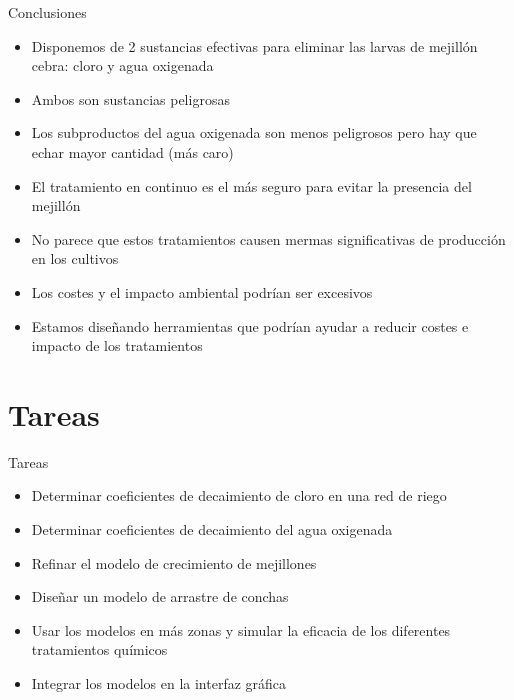 \documentclass[pdr]{beamer}
\begin{document}
\begin{frame}{Conclusiones}
	\begin{itemize}
		\item Disponemos de 2 sustancias efectivas para eliminar las
			larvas de mejillón cebra: cloro y agua oxigenada
		\item Ambos son sustancias peligrosas
		\item Los subproductos del agua oxigenada son menos peligrosos
			pero hay que echar mayor cantidad (más caro)
		\item El tratamiento en continuo es el más seguro para evitar la
			presencia del mejillón
		\item No parece que estos tratamientos causen mermas
			significativas de producción en los cultivos
		\item Los costes y el impacto ambiental podrían ser excesivos
		\item Estamos diseñando herramientas que podrían ayudar a
			reducir costes e impacto de los tratamientos
	\end{itemize}
\end{frame}

\section{Tareas}

\begin{frame}{Tareas}
	\begin{itemize}
		\item Determinar coeficientes de decaimiento de cloro en una red
			de riego
		\item Determinar coeficientes de decaimiento del agua oxigenada
		\item Refinar el modelo de crecimiento de mejillones
		\item Diseñar un modelo de arrastre de conchas
		\item Usar los modelos en más zonas y simular la eficacia de los
			diferentes tratamientos químicos
		\item Integrar los modelos en la interfaz gráfica
	\end{itemize}
\end{frame}
\end{document}
